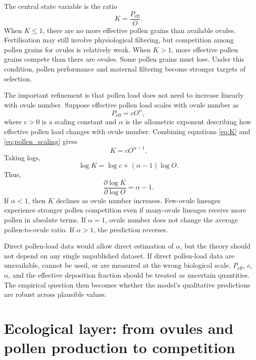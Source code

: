 \documentclass[11pt]{article}
\newcommand{\Peff}{P_{\mathrm{eff}}}
\begin{document}
The central state variable is the ratio
\begin{equation}
K = \frac{\Peff}{O}.
\label{eq:K}
\end{equation}
When \(K \leq 1\), there are no more effective pollen grains than available ovules. Fertilisation may still involve physiological filtering, but competition among pollen grains for ovules is relatively weak. When \(K>1\), more effective pollen grains compete than there are ovules. Some pollen grains must lose. Under this condition, pollen performance and maternal filtering become stronger targets of selection.

The important refinement is that pollen load does not need to increase linearly with ovule number. Suppose effective pollen load scales with ovule number as
\begin{equation}
\Peff = cO^{\alpha},
\label{eq:pollen_scaling}
\end{equation}
where \(c>0\) is a scaling constant and \(\alpha\) is the allometric exponent describing how effective pollen load changes with ovule number. Combining equations \eqref{eq:K} and \eqref{eq:pollen_scaling} gives
\begin{equation}
K = cO^{\alpha-1}.
\label{eq:K_scaling}
\end{equation}
Taking logs,
\begin{equation}
\log K = \log c + (\alpha-1)\log O.
\end{equation}
Thus,
\begin{equation}
\frac{\partial \log K}{\partial \log O} = \alpha - 1.
\label{eq:elasticity}
\end{equation}
If \(\alpha<1\), then \(K\) declines as ovule number increases. Few-ovule lineages experience stronger pollen competition even if many-ovule lineages receive more pollen in absolute terms. If \(\alpha=1\), ovule number does not change the average pollen-to-ovule ratio. If \(\alpha>1\), the prediction reverses.

Direct pollen-load data would allow direct estimation of \(\alpha\), but the theory should not depend on any single unpublished dataset. If direct pollen-load data are unavailable, cannot be used, or are measured at the wrong biological scale, \(\Peff\), \(c\), \(\alpha\), and the effective deposition fraction should be treated as uncertain quantities. The empirical question then becomes whether the model's qualitative predictions are robust across plausible values.

\section{Ecological layer: from ovules and pollen production to competition}
\end{document}
